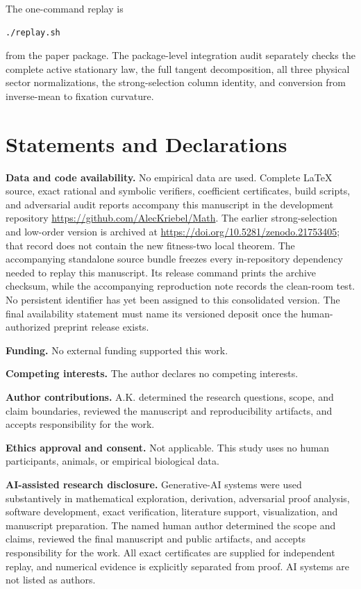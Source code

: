 The one-command replay is
\begin{verbatim}
./replay.sh
\end{verbatim}
from the paper package.  The package-level integration audit separately
checks the complete active stationary law, the full tangent decomposition,
all three physical sector normalizations, the strong-selection column identity, and
conversion from inverse-mean to fixation curvature.

\section*{Statements and Declarations}

\noindent\textbf{Data and code availability.}
No empirical data are used.  Complete LaTeX source, exact rational and
symbolic verifiers, coefficient certificates, build scripts, and adversarial
audit reports accompany this manuscript in the development repository
\url{https://github.com/AlecKriebel/Math}.  The earlier strong-selection and
low-order version is archived at
\url{https://doi.org/10.5281/zenodo.21753405}; that record does not contain
the new fitness-two local theorem.  The accompanying standalone source bundle
freezes every in-repository dependency needed to replay this manuscript.  Its
release command prints the archive checksum, while the accompanying
reproduction note records the clean-room test.  No persistent identifier has
yet been assigned to this consolidated
version.  The final availability statement must name its versioned deposit
once the human-authorized preprint release exists.

\medskip
\noindent\textbf{Funding.}
No external funding supported this work.

\medskip
\noindent\textbf{Competing interests.}
The author declares no competing interests.

\medskip
\noindent\textbf{Author contributions.}
A.K. determined the research questions, scope, and claim boundaries, reviewed
the manuscript and reproducibility artifacts, and accepts responsibility for
the work.

\medskip
\noindent\textbf{Ethics approval and consent.}
Not applicable.  This study uses no human participants, animals, or empirical
biological data.

\medskip
\noindent\textbf{AI-assisted research disclosure.}
Generative-AI systems were used substantively in mathematical exploration,
derivation, adversarial proof analysis, software development, exact
verification, literature support, visualization, and manuscript preparation.
The named human author determined the scope and claims, reviewed the final
manuscript and public artifacts, and accepts responsibility for the work.  All
exact certificates are supplied for independent replay, and numerical
evidence is explicitly separated from proof.  AI systems are not listed as
authors.
